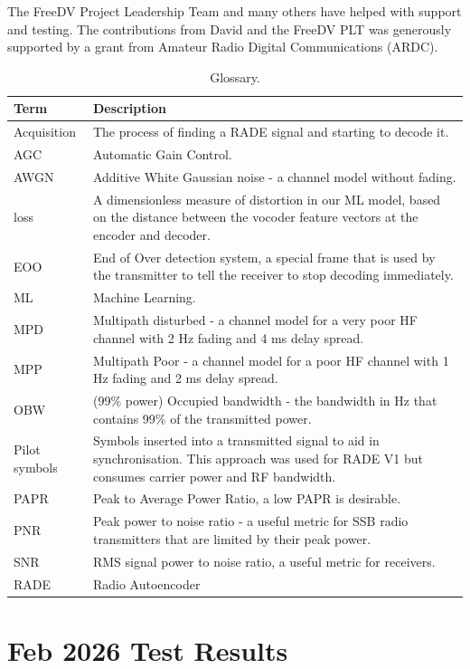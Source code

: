 \documentclass{article}
\begin{document}
The FreeDV Project Leadership Team and many others have helped with support and testing. The contributions from David and the FreeDV PLT was generously supported by a grant from Amateur Radio Digital Communications (ARDC).

\begin{table} [h]
\caption{Glossary.}
\label{tab:glossary}
\centering
\begin{tabular}{ p{2.5cm} | p{10cm} }
 \hline
  Term & Description \\
 \hline
  Acquisition & The process of finding a RADE signal and starting to decode it. \\
  AGC & Automatic Gain Control. \\
  AWGN & Additive White Gaussian noise - a channel model without fading. \\
  loss & A dimensionless measure of distortion in our ML model, based on the distance between the vocoder feature vectors at the encoder and decoder. \\
  EOO & End of Over detection system, a special frame that is used by the transmitter to tell the receiver to stop decoding immediately. \\
  ML & Machine Learning. \\
  MPD & Multipath disturbed - a channel model for a very poor HF channel with 2 \si{Hz} fading and 4 \si{ms} delay spread. \\
  MPP & Multipath Poor - a channel model for a poor HF channel with 1 \si{Hz} fading and 2 \si{ms} delay spread. \\
  OBW & (99\% power) Occupied bandwidth - the bandwidth in \si{Hz} that contains 99\% of the transmitted power. \\
  Pilot symbols & Symbols inserted into a transmitted signal to aid in synchronisation. This approach was used for RADE V1 but consumes carrier power and RF bandwidth. \\
  PAPR & Peak to Average Power Ratio, a low PAPR is desirable. \\
  PNR & Peak power to noise ratio - a useful metric for SSB radio transmitters that are limited by their peak power. \\
  SNR & RMS signal power to noise ratio, a useful metric for receivers. \\
  RADE & Radio Autoencoder \\
 \hline
\end{tabular}
\end{table}

\section{Feb 2026 Test Results}
\end{document}
